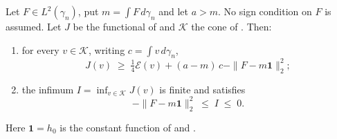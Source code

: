 \begin{lemma}
Let $F \in L^2(\gamma_n)$, put $m = \int F \, d\gamma_n$ and let $a > m$.
No sign condition on $F$ is assumed.  Let $J$ be the functional of
 and $\mathcal{K}$ the cone of
.  Then:
\begin{enumerate}
\item for every $v \in \mathcal{K}$, writing $c = \int v \, d\gamma_n$,
\[
  J(v) \;\geq\; \tfrac14 \mathcal{E}(v) + (a-m)\,c - \|F - m\mathbf{1}\|_2^2 ;
\]
\item the infimum $I = \inf_{v\in\mathcal{K}} J(v)$ is finite and satisfies
\[
  -\|F - m\mathbf{1}\|_2^2 \;\leq\; I \;\leq\; 0 .
\]
\end{enumerate}
Here $\mathbf{1} = h_0$ is the constant function of  and
.
\end{lemma}
